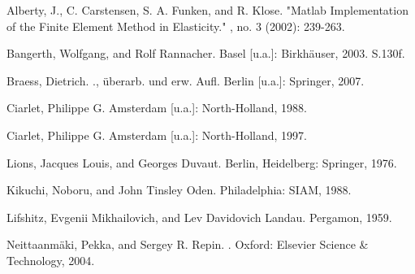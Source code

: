 \documentclass{scrartcl}
\begin{document}
\newpage

\begin{thebibliography}{00}

\newblock Alberty, J., C. Carstensen, S. A. Funken, and R. Klose.
\newblock "Matlab Implementation of the Finite Element Method in Elasticity."
, no. 3 (2002): 239-263. 

\newblock Bangerth, Wolfgang, and Rolf Rannacher.
\newblock Basel [u.a.]: Birkhäuser, 2003. S.130f.

\newblock Braess, Dietrich.
., überarb. und erw. Aufl.
\newblock Berlin [u.a.]: Springer, 2007.

\newblock Ciarlet, Philippe G.
\newblock Amsterdam [u.a.]: North-Holland, 1988.

\newblock Ciarlet, Philippe G.
\newblock Amsterdam [u.a.]: North-Holland, 1997. 

\newblock Lions, Jacques Louis, and Georges Duvaut.
\newblock Berlin, Heidelberg: Springer, 1976. 

\newblock Kikuchi, Noboru, and John Tinsley Oden.
\newblock Philadelphia: SIAM, 1988. 

\newblock Lifshitz, Evgenii Mikhailovich, and Lev Davidovich Landau.
\newblock Pergamon, 1959.

\newblock Neittaanmäki, Pekka, and Sergey R. Repin.
.
\newblock Oxford: Elsevier Science \& Technology, 2004.


\end{thebibliography}
\end{document}
